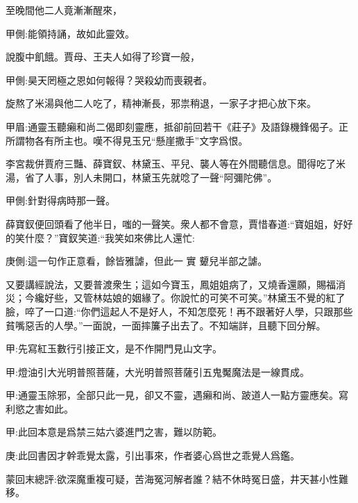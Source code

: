 \begin{parag}
    至晚間他二人竟漸漸醒來，\begin{note}甲側:能領持誦，故如此靈效。\end{note}說腹中飢餓。賈母、王夫人如得了珍寶一般，\begin{note}甲側:昊天罔極之恩如何報得？哭殺幼而喪親者。\end{note}旋熬了米湯與他二人吃了，精神漸長，邪祟稍退，一家子才把心放下來。\begin{note}甲眉:通靈玉聽癩和尚二偈即刻靈應，抵卻前回若干《莊子》及語錄機鋒偈子。正所謂物各有所主也。嘆不得見玉兄“懸崖撒手”文字爲恨。\end{note}李宮裁併賈府三豔、薛寶釵、林黛玉、平兒、襲人等在外間聽信息。聞得吃了米湯，省了人事，別人未開口，林黛玉先就唸了一聲“阿彌陀佛”。\begin{note}甲側:針對得病時那一聲。\end{note}薛寶釵便回頭看了他半日，嗤的一聲笑。衆人都不會意，賈惜春道:“寶姐姐，好好的笑什麼？”寶釵笑道:“我笑如來佛比人還忙:\begin{note}庚側:這一句作正意看，餘皆雅謔，但此一 實 顰兒半部之謔。\end{note}又要講經說法，又要普渡衆生；這如今寶玉，鳳姐姐病了，又燒香還願，賜福消災；今纔好些，又管林姑娘的姻緣了。你說忙的可笑不可笑。”林黛玉不覺的紅了臉，啐了一口道:“你們這起人不是好人，不知怎麼死！再不跟著好人學，只跟那些貧嘴惡舌的人學。”一面說，一面摔簾子出去了。不知端詳，且聽下回分解。
\end{parag}


\begin{parag}
    \begin{note}甲:先寫紅玉數行引接正文，是不作開門見山文字。\end{note}
\end{parag}


\begin{parag}
    \begin{note}甲:燈油引大光明普照菩薩，大光明普照菩薩引五鬼魘魔法是一線貫成。\end{note}
\end{parag}


\begin{parag}
    \begin{note}甲:通靈玉除邪，全部只此一見，卻又不靈，遇癩和尚、跛道人一點方靈應矣。寫利慾之害如此。\end{note}
\end{parag}


\begin{parag}
    \begin{note}甲:此回本意是爲禁三姑六婆進門之害，難以防範。\end{note}
\end{parag}


\begin{parag}
    \begin{note}庚:此回書因才幹乖覺太露，引出事來，作者婆心爲世之乖覺人爲鑑。\end{note}
\end{parag}


\begin{parag}
    \begin{note}蒙回末總評:欲深魔重複可疑，苦海冤河解者誰？結不休時冤日盛，井天甚小性難移。\end{note}
\end{parag}

